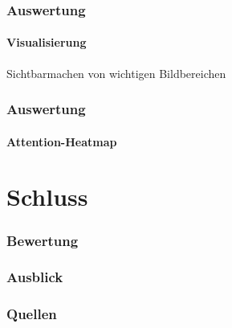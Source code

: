 \documentclass{beamer}
\begin{document}
\begin{frame}
\frametitle{Auswertung}
\framesubtitle{Visualisierung}
Sichtbarmachen von wichtigen Bildbereichen

\end{frame}


\begin{frame}
\frametitle{Auswertung}
\framesubtitle{Attention-Heatmap}


\end{frame}

\section{Schluss}
\frame{\tableofcontents[currentsection]}

\begin{frame}
\frametitle{Bewertung}

\end{frame}

\begin{frame}
\frametitle{Ausblick}

\end{frame}

\begin{frame}
\frametitle{Quellen}


\end{frame}
\end{document}

